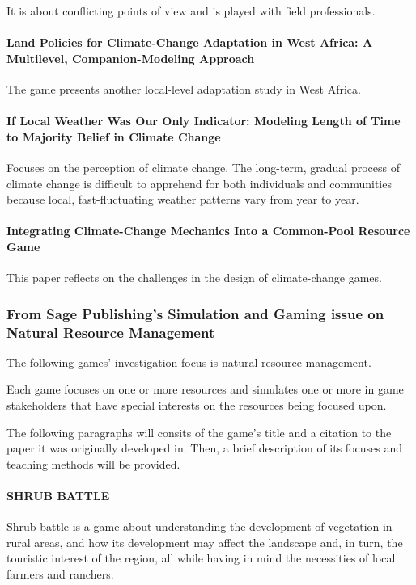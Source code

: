 It is about conflicting points of view and is played with field professionals.

\paragraph{Land Policies for Climate-Change Adaptation in West Africa: A Multilevel, Companion-Modeling Approach
\cite{DAquino2013}}
The game presents another local-level adaptation study in West Africa.

\paragraph{If Local Weather Was Our Only Indicator: Modeling Length of Time to Majority Belief in Climate Change
\cite{Szafran2013}}
Focuses on the perception of climate change. The long-term, gradual process of climate change is difficult to apprehend for both individuals and communities because local, fast-fluctuating weather patterns vary from year to year.

\paragraph{Integrating Climate-Change Mechanics Into a Common-Pool Resource Game
\cite{Fennewald2013}}
This paper reflects on the challenges in the design of climate-change games.

\subsubsection{From Sage Publishing's Simulation and Gaming
issue on Natural Resource Management}

The following games' investigation focus is natural resource management.

Each game focuses on one or more resources and simulates one or more in game
stakeholders that have special interests on the resources being focused upon.

The following paragraphs will consits of the game's title and a citation
to the paper it was originally developed in. Then, a brief description
of its focuses and teaching methods will be provided.

\paragraph{SHRUB BATTLE
\cite{Depigny2007}}
Shrub battle is a game about understanding the development of vegetation in
rural areas, and how its development may affect the landscape and, in turn,
the touristic interest of the region, all while having in mind
the necessities of local farmers and ranchers.

